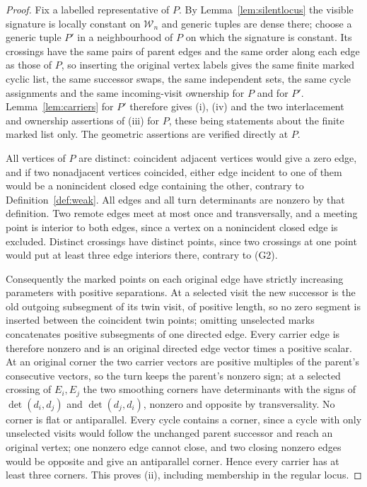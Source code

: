 \begin{proof}
Fix a labelled representative of $P$. By Lemma~\ref{lem:silentlocus} the
visible signature is locally constant on $\mathcal W_n$ and generic tuples
are dense there; choose a generic tuple $P'$ in a neighbourhood of $P$ on
which the signature is constant. Its crossings have the same pairs of
parent edges and the same order along each edge as those of $P$, so
inserting the original vertex labels gives the same finite marked cyclic
list, the same successor swaps, the same independent sets, the same cycle
assignments and the same incoming-visit ownership for $P$ and for $P'$.
Lemma~\ref{lem:carriers} for $P'$ therefore gives (i), (iv) and the two
interlacement and ownership assertions of (iii) for $P$, these being
statements about the finite marked list only. The geometric assertions are
verified directly at $P$.

All vertices of $P$ are distinct: coincident adjacent vertices would give a
zero edge, and if two nonadjacent vertices coincided, either edge incident
to one of them would be a nonincident closed edge containing the other,
contrary to Definition~\ref{def:weak}. All edges and all turn determinants
are nonzero by that definition. Two remote edges meet at most once and
transversally, and a meeting point is interior to both edges, since a vertex
on a nonincident closed edge is excluded. Distinct crossings have distinct
points, since two crossings at one point would put at least three edge
interiors there, contrary to (G2).

Consequently the marked points on each original edge have strictly
increasing parameters with positive separations. At a selected visit the
new successor is the old outgoing subsegment of its twin visit, of positive
length, so no zero segment is inserted between the coincident twin points;
omitting unselected marks concatenates positive subsegments of one directed
edge. Every carrier edge is therefore nonzero and is an original directed
edge vector times a positive scalar. At an original corner the two carrier
vectors are positive multiples of the parent's consecutive vectors, so the
turn keeps the parent's nonzero sign; at a selected crossing of $E_i,E_j$
the two smoothing corners have determinants with the signs of
$\det(d_i,d_j)$ and $\det(d_j,d_i)$, nonzero and opposite by
transversality. No corner is flat or antiparallel. Every cycle contains a
corner, since a cycle with only unselected visits would follow the
unchanged parent successor and reach an original vertex; one nonzero edge
cannot close, and two closing nonzero edges would be opposite and give an
antiparallel corner. Hence every carrier has at least three corners. This
proves (ii), including membership in the regular locus.


\end{proof}
